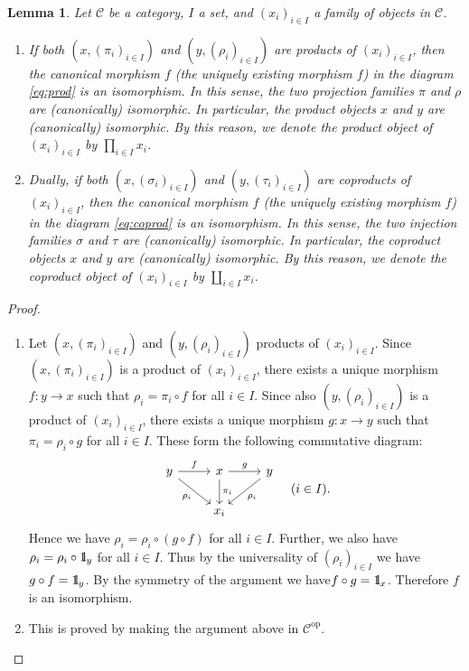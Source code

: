 \documentclass{surv-l}
\numberwithin{equation}{chapter}
\numberwithin{figure}{chapter}
\theoremstyle{plain}
\newtheorem{lem}[thm]{Lemma}
\theoremstyle{definition}
\theoremstyle{remark}
\newcommand{\id}{1\kern-.25em{\text{{\rm l}}}}
\newcommand{\Ar}[3]{\ar[from={#1}, to={#2}, #3]}
\begin{document}
\begin{lem}\label{lem:unique-prod-coprod}
Let ${\mathcal{C}}$ be a category, $I$ a set, and $(x_i)_{i\in I}$ a family of objects in
${\mathcal{C}}$.
\begin{enumerate}
\item
If both $(x, (\pi_i)_{i\in I})$ and $(y, (\rho_i)_{i\in I})$ are products of
$(x_i)_{i\in I}$, then the canonical morphism $f$ (the uniquely existing morphism $f$) in the diagram \eqref{eq:prod}
is an isomorphism.
In this sense, the two projection families $\pi$ and $\rho$ are (canonically) isomorphic.
In particular, the product objects $x$ and $y$ are (canonically) isomorphic.
By this reason, we denote the product object of $(x_i)_{i\in I}$ by $\prod_{i\in I}x_i$.

\item
Dually, if both $(x, (\sigma_i)_{i\in I})$ and $(y, (\tau_i)_{i\in I})$ are coproducts of
$(x_i)_{i\in I}$, then the canonical morphism $f$ (the uniquely existing morphism $f$) in the diagram \eqref{eq:coprod}
is an isomorphism.
In this sense, the two injection families $\sigma$ and $\tau$ are (canonically) isomorphic.
In particular, the coproduct objects $x$ and $y$ are (canonically) isomorphic.
By this reason, we denote the coproduct object of $(x_i)_{i\in I}$ by $\coprod_{i\in I}x_i$.
\end{enumerate}
\end{lem}

\begin{proof}\leavevmode
\begin{enumerate}[wide]
\item Let $(x, (\pi_i)_{i\in I})$ and $(y, (\rho_i)_{i\in I})$ products of $(x_i)_{i\in I}$.
Since $(x, (\pi_i)_{i\in I})$ is a product of $(x_i)_{i\in I}$, there exists a unique
morphism $f \colon y \to x$ such that
$\rho_i = \pi_i \circ f$ for all $i \in I$.
Since also $(y, (\rho_i)_{i\in I})$ is a product of $(x_i)_{i\in I}$,
there exists a unique morphism $g \colon x \to y$ such that
$\pi_i = \rho_i \circ g$ for all $i \in I$.
These form the following commutative diagram:
\[
\begin{tikzcd}
y & x & y\\
& x_i
\Ar{1-1}{1-2}{"f"}
\Ar{1-2}{1-3}{"g"}
\Ar{1-1}{2-2}{"\rho_i" '}
\Ar{1-2}{2-2}{"\pi_i"}
\Ar{1-3}{2-2}{"\rho_i"}
\end{tikzcd}
\quad (i \in I).
\]
Hence we have $\rho_i = \rho_i \circ (g \circ f)$ for all $i \in I$.
Further, we also have $\rho_i = \rho_i \circ \id_y$ for all $i \in I$.
Thus by the universality of $(\rho_i)_{i\in I}$ we have $g \circ f = \id_y$.
By the symmetry of the argument we have$f \circ g = \id_x$.
Therefore $f$ is an isomorphism.

\item This is proved by making the argument above in
  ${\mathcal{C}}^{\mathrm{op}}$.
\end{enumerate}
\end{proof}
\end{document}
